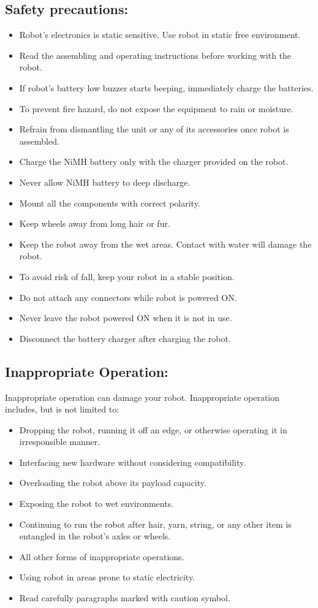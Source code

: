 \documentclass[a4paper,12pt,oneside]{article}
\begin{document}
{	\subsection{\textbf{Safety precautions:}}
	\begin{itemize}

	\item  Robot’s electronics is static sensitive. Use robot in static free environment.
	\item Read the assembling and operating instructions before working with the robot.
	\item If robot’s battery low buzzer starts beeping, immediately charge the batteries.
	\item To prevent fire hazard, do not expose the equipment to rain or moisture.
	\item Refrain from dismantling the unit or any of its accessories once robot is assembled.
	\item Charge the NiMH battery only with the charger provided on the robot.
	\item Never allow NiMH battery to deep discharge.
	\item Mount all the components with correct polarity.
	\item Keep wheels away from long hair or fur.
	\item Keep the robot away from the wet areas. Contact with water will damage the robot.
	\item To avoid risk of fall, keep your robot in a stable position.
	\item Do not attach any connectors while robot is powered ON.
	\item Never leave the robot powered ON when it is not in use.
	\item Disconnect the battery charger after charging the robot. 
\end{itemize}
	\subsection{\textbf{Inappropriate Operation:}}
	Inappropriate operation can damage your robot. Inappropriate operation includes, but is not
	limited to:
	\begin{itemize}
	\item Dropping the robot, running it off an edge, or otherwise operating it in irresponsible
	manner.
	\item Interfacing new hardware without considering compatibility.
	\item Overloading the robot above its payload capacity.
	\item Exposing the robot to wet environments.
	\item Continuing to run the robot after hair, yarn, string, or any other item is entangled in the
	robot’s axles or wheels.
	\item All other forms of inappropriate operations.
	\item Using robot in areas prone to static electricity.
	\item Read carefully paragraphs marked with caution symbol.
	\end{itemize}
}
\end{document}
